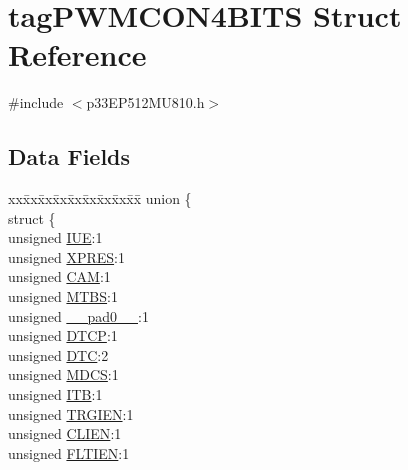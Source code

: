 \hypertarget{structtag_p_w_m_c_o_n4_b_i_t_s}{}\section{tag\+P\+W\+M\+C\+O\+N4\+B\+I\+TS Struct Reference}
\label{structtag_p_w_m_c_o_n4_b_i_t_s}


{\ttfamily \#include $<$p33\+E\+P512\+M\+U810.\+h$>$}

\subsection*{Data Fields}
\begin{DoxyCompactItemize}
\item 
\begin{tabbing}
xx\=xx\=xx\=xx\=xx\=xx\=xx\=xx\=xx\=\kill
union \{\\
\>struct \{\\
\>\>unsigned \hyperlink{structtag_p_w_m_c_o_n4_b_i_t_s_a2b95b61e8c208d0ffdc7441133d3b0a3}{IUE}:1\\
\>\>unsigned \hyperlink{structtag_p_w_m_c_o_n4_b_i_t_s_a6a3f824223966417e0005dbe08b1833c}{XPRES}:1\\
\>\>unsigned \hyperlink{structtag_p_w_m_c_o_n4_b_i_t_s_a912fd2c19cfc2bb7d43e4cb3bae4d0bf}{CAM}:1\\
\>\>unsigned \hyperlink{structtag_p_w_m_c_o_n4_b_i_t_s_ad4b1db357995f4e3ff43d2e6c734159e}{MTBS}:1\\
\>\>unsigned \hyperlink{structtag_p_w_m_c_o_n4_b_i_t_s_adf71f3d8410c1f1dbbc96680a92c49af}{\_\_pad0\_\_}:1\\
\>\>unsigned \hyperlink{structtag_p_w_m_c_o_n4_b_i_t_s_a42fd7808d2a3b328aac343a2c4e781d7}{DTCP}:1\\
\>\>unsigned \hyperlink{structtag_p_w_m_c_o_n4_b_i_t_s_a0ac766a24b648c50040810c3f207926c}{DTC}:2\\
\>\>unsigned \hyperlink{structtag_p_w_m_c_o_n4_b_i_t_s_acb5516c8c2c937478d0e653afdb05254}{MDCS}:1\\
\>\>unsigned \hyperlink{structtag_p_w_m_c_o_n4_b_i_t_s_a5d923b710199bb786b4c9f1d71b104f2}{ITB}:1\\
\>\>unsigned \hyperlink{structtag_p_w_m_c_o_n4_b_i_t_s_a4dd5600256667e48b1fe49e80ef95d33}{TRGIEN}:1\\
\>\>unsigned \hyperlink{structtag_p_w_m_c_o_n4_b_i_t_s_a6536fa9a3ad62ffb7a3ed0a2b1bf6394}{CLIEN}:1\\
\>\>unsigned \hyperlink{structtag_p_w_m_c_o_n4_b_i_t_s_a4d88b1c37d3feefa1055445ffc9a981c}{FLTIEN}:1\\

\end{tabbing}
\end{DoxyCompactItemize}
